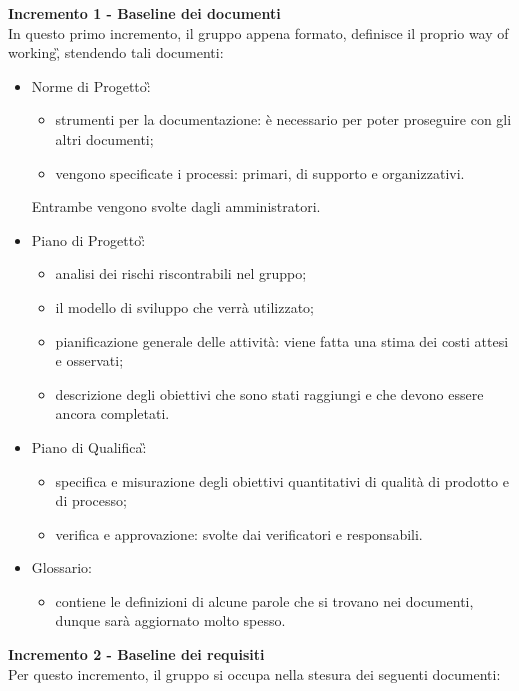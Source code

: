{{    \textbf{Incremento 1 - Baseline dei documenti}\\  
    In questo primo incremento, il gruppo appena formato, definisce il proprio way of working\G, stendendo tali documenti:
    \begin{itemize}
        \item Norme di Progetto\G:
            \begin{itemize}
                \item strumenti per la documentazione: è necessario per poter proseguire con gli altri documenti;
                \item vengono specificate i processi: primari, di supporto e organizzativi. 
            \end{itemize}
        Entrambe vengono svolte dagli amministratori.
        \item Piano di Progetto\G: 
            \begin{itemize}
                \item analisi dei rischi riscontrabili nel gruppo;
                \item il modello di sviluppo che verrà utilizzato;
                \item pianificazione generale delle attività: viene fatta una stima dei costi attesi e osservati;
                \item descrizione degli obiettivi che sono stati raggiungi e che devono essere ancora completati.
            \end{itemize}
        \item Piano di Qualifica\G: 
            \begin{itemize}
                \item specifica e misurazione degli obiettivi quantitativi di qualità di prodotto e di processo;
                \item verifica e approvazione: svolte dai verificatori e responsabili.
            \end{itemize}
        \item Glossario: 
            \begin{itemize}
                \item contiene le definizioni di alcune parole che si trovano nei documenti, dunque sarà aggiornato molto spesso.
            \end{itemize}
    \end{itemize}
    \textbf{Incremento 2 - Baseline dei requisiti} \\
    Per questo incremento, il gruppo si occupa nella stesura dei seguenti documenti:
}}
